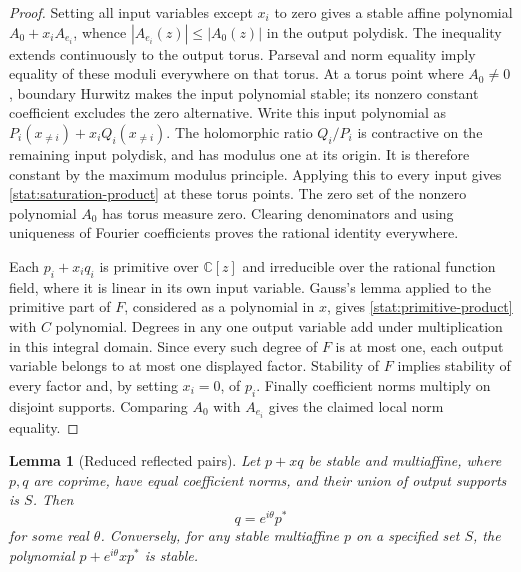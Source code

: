 \documentclass[reqno]{amsart}
\newtheorem{lemma}[theorem]{Lemma}
\theoremstyle{definition}
\theoremstyle{remark}
\newcommand{\C}{\mathbb C}
\begin{document}
\begin{proof}
Setting all input variables except \(x_i\) to zero gives a stable
affine polynomial \(A_0+x_iA_{e_i}\), whence
\(|A_{e_i}(z)|\le|A_0(z)|\) in the output polydisk.
The inequality extends continuously to the output torus.  Parseval
and norm equality imply equality of these moduli everywhere on that
torus.  At a torus point where \(A_0\ne0\), boundary Hurwitz makes
the input polynomial stable; its nonzero constant coefficient
excludes the zero alternative.  Write this input polynomial as
\(P_i(x_{\ne i})+x_iQ_i(x_{\ne i})\).  The holomorphic ratio
\(Q_i/P_i\) is contractive on the remaining input polydisk, and
has modulus one at its origin.  It is therefore constant by the
maximum modulus principle.  Applying this to every input gives
\eqref{stat:saturation-product} at these torus points.
The zero set of the nonzero polynomial \(A_0\) has torus measure
zero.  Clearing denominators and using uniqueness of Fourier
coefficients proves the rational identity everywhere.

Each \(p_i+x_iq_i\) is primitive over \(\C[z]\) and irreducible
over the rational function field, where it is linear in its own
input variable.  Gauss's lemma applied to the primitive part of
\(F\), considered as a polynomial in \(x\), gives
\eqref{stat:primitive-product} with \(C\) polynomial.  Degrees in
any one output variable add under multiplication in this integral
domain.  Since every such degree of \(F\) is at most one, each
output variable belongs to at most one displayed factor.  Stability
of \(F\) implies stability of every factor and, by setting
\(x_i=0\), of \(p_i\).  Finally coefficient norms multiply on
disjoint supports.  Comparing \(A_0\) with \(A_{e_i}\) gives the
claimed local norm equality.
\end{proof}

\begin{lemma}[Reduced reflected pairs]
\label{stat:reflected-pair}
Let \(p+xq\) be stable and multiaffine, where \(p,q\) are
coprime, have equal coefficient norms, and their union of output
supports is \(S\).  Then
\begin{equation}
 q=e^{i\theta}p^*
 \label{stat:pair-reflection}
\end{equation}
for some real \(\theta\).  Conversely, for any stable multiaffine
\(p\) on a specified set \(S\), the polynomial
\(p+e^{i\theta}xp^*\) is stable.
\end{lemma}
\end{document}
